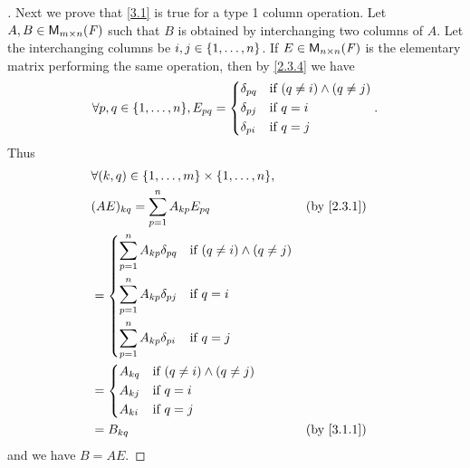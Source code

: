 \begin{proof}[]
	Next we prove that \cref{3.1} is true for a type 1 column operation.
	Let \(A, B \in \MS\) such that \(B\) is obtained by interchanging two columns of \(A\).
	Let the interchanging columns be \(i, j \in \left\lbrace1, \dots, n\right\rbrace\).
	If \(E \in \ms[n][n][\F]\) is the elementary matrix performing the same operation, then by \cref{2.3.4} we have
	\[
		\forall p, q \in \set{1, \dots, n}, E_{p q} = \begin{dcases}
			\delta_{p q} & \text{if } (q \neq i) \land (q \neq j) \\
			\delta_{p j} & \text{if } q = i                       \\
			\delta_{p i} & \text{if } q = j
		\end{dcases}.
	\]
	Thus
	\begin{align*}
		 & \forall (k, q) \in \set{1, \dots, m} \times \set{1, \dots, n},                                  \\
		 & (AE)_{k q} = \sum_{p = 1}^n A_{k p} E_{p q}                                     &  & \by{2.3.1} \\
		 & = \begin{dcases}
			     \sum_{p = 1}^n A_{k p} \delta_{p q} & \text{if } (q \neq i) \land (q \neq j) \\
			     \sum_{p = 1}^n A_{k p} \delta_{p j} & \text{if } q = i                       \\
			     \sum_{p = 1}^n A_{k p} \delta_{p i} & \text{if } q = j
		     \end{dcases}                  \\
		 & = \begin{dcases}
			     A_{k q} & \text{if } (q \neq i) \land (q \neq j) \\
			     A_{k j} & \text{if } q = i                       \\
			     A_{k i} & \text{if } q = j
		     \end{dcases}                                              \\
		 & = B_{k q}                                                                       &  & \by{3.1.1}
	\end{align*}
	and we have \(B = AE\).


\end{proof}
